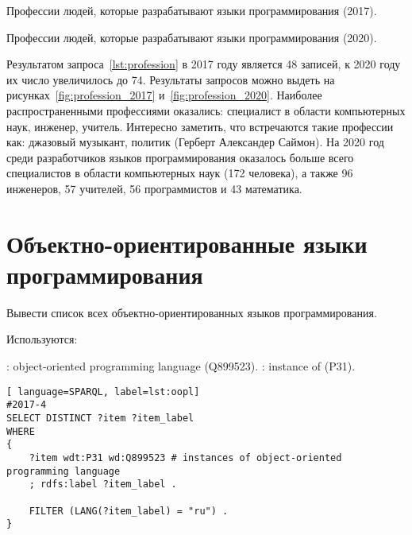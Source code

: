 \begin{marginfigure}
{
\setlength{\fboxsep}{0pt}%
\setlength{\fboxrule}{1pt}%
%
}
  \caption{Профессии людей, которые разрабатывают языки программирования (2017).}%
  \label{fig:profession_2017}%
\end{marginfigure}
\begin{marginfigure}
{
\setlength{\fboxsep}{0pt}%
\setlength{\fboxrule}{1pt}%
%
}
  \caption{Профессии людей, которые разрабатывают языки программирования (2020).}%
  \label{fig:profession_2020}%
\end{marginfigure}

Результатом запроса~\ref{lst:profession} в 2017 году является 48 записей, к 2020 году их число увеличилось до 74. Результаты запросов можно выдеть на рисунках~\ref{fig:profession_2017} и~\ref{fig:profession_2020}.
Наиболее распространенными профессиями оказались: специалист в области компьютерных наук, инженер, учитель. Интересно заметить, что встречаются такие профессии как: джазовый музыкант, политик (Герберт Александер Саймон). На 2020 год среди разработчиков языков программирования оказалось больше всего специалистов в области компьютерных наук (172 человека), а также 96 инженеров, 57 учителей, 56 программистов и 43 математика.

\section{Объектно-ориентированные языки программирования}
Вывести список всех объектно-ориентированных языков программирования.

Используются:
\begin{itemize}
: object-oriented programming language (Q899523).
: instance of (P31).
\end{itemize}

\begin{lstlisting}[ language=SPARQL, label=lst:oopl]
#2017-4
SELECT DISTINCT ?item ?item_label
WHERE
{
    ?item wdt:P31 wd:Q899523 # instances of object-oriented programming language
    ; rdfs:label ?item_label . 

    FILTER (LANG(?item_label) = "ru") . 
}
\end{lstlisting}

